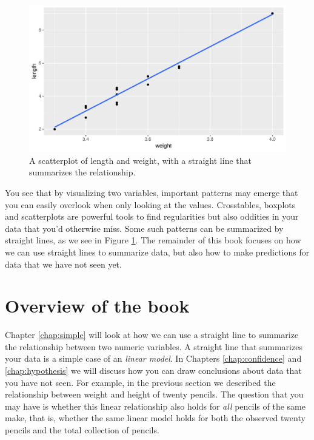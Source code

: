\documentclass[]{report}\usepackage[]{graphicx}\usepackage[]{color}
\makeatletter
\def\maxwidth{ %
  \ifdim\Gin@nat@width>\linewidth
    \linewidth
  \else
    \Gin@nat@width
  \fi
}
\makeatother
\begin{document}
\begin{figure}

{\centering \includegraphics[width=\maxwidth]{figure/line_1-1} 

}

\caption[A scatterplot of length and weight, with a straight line that summarizes the relationship]{A scatterplot of length and weight, with a straight line that summarizes the relationship.}\label{fig:line_1}
\end{figure}



You see that by visualizing two variables, important patterns may emerge that you can easily overlook when only looking at the values. Crosstables, boxplots and scatterplots are powerful tools to find regularities but also oddities in your data that you'd otherwise miss. Some such patterns can be summarized by straight lines, as we see in Figure \ref{fig:line_1}. The remainder of this book focuses on how we can use straight lines to summarize data, but also how to make predictions for data that we have not seen yet.


\section{Overview of the book}

Chapter \ref{chap:simple} will look at how we can use a straight line to summarize the relationship between two numeric variables. A straight line that summarizes your data is a simple case of an \textit{linear model}. In Chapters \ref{chap:confidence} and \ref{chap:hypothesis} we will discuss how you can draw conclusions about data that you have not seen. For example, in the previous section we described the relationship between weight and height of twenty pencils. The question that you may have is whether this linear relationship also holds for \textit{all} pencils of the same make, that is, whether the same linear model holds for both the observed twenty pencils and the total collection of pencils.
\end{document}
